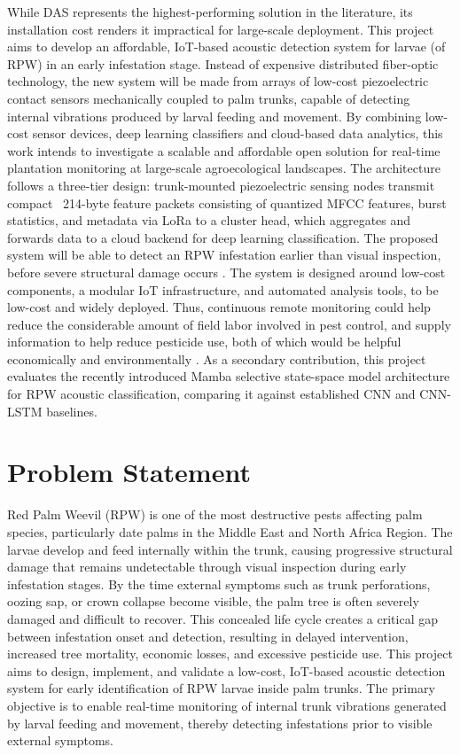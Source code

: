 \documentclass[12pt,a4paper,oneside]{memoir}
\begin{document}
While DAS represents the highest-performing solution in the literature, its installation cost renders it impractical for large-scale deployment. This project aims to develop an affordable, IoT-based acoustic detection system for larvae (of RPW) in an early infestation stage. Instead of expensive distributed fiber-optic technology, the new system will be made from arrays of low-cost piezoelectric contact sensors mechanically coupled to palm trunks, capable of detecting internal vibrations produced by larval feeding and movement. By combining low-cost sensor devices, deep learning classifiers and cloud-based data analytics, this work intends to investigate a scalable and affordable open solution for real-time plantation monitoring at large-scale agroecological landscapes. The architecture follows a three-tier design: trunk-mounted piezoelectric sensing nodes transmit compact ~214-byte feature packets consisting of quantized MFCC features, burst statistics, and metadata via LoRa to a cluster head, which aggregates and forwards data to a cloud backend for deep learning classification. The proposed system will be able to detect an RPW infestation earlier than visual inspection, before severe structural damage occurs \cite{ashry2020,ashry2022cnn,karar2022}. The system is designed around low-cost components, a modular IoT infrastructure, and automated analysis tools, to be low-cost and widely deployed. Thus, continuous remote monitoring could help reduce the considerable amount of field labor involved in pest control, and supply information to help reduce pesticide use, both of which would be helpful economically and environmentally \cite{saleem2022,karar2022}. As a secondary contribution, this project evaluates the recently introduced Mamba selective state-space model architecture for RPW acoustic classification, comparing it against established CNN and CNN-LSTM baselines.
 
\section{Problem Statement}
\label{sec:Statement}
 
Red Palm Weevil (RPW) is one of the most destructive pests affecting palm species, particularly date palms in the Middle East and North Africa Region. The larvae develop and feed internally within the trunk, causing progressive structural damage that remains undetectable through visual inspection during early infestation stages. By the time external symptoms such as trunk perforations, oozing sap, or crown collapse become visible, the palm tree is often severely damaged and difficult to recover. This concealed life cycle creates a critical gap between infestation onset and detection, resulting in delayed intervention, increased tree mortality, economic losses, and excessive pesticide use. This project aims to design, implement, and validate a low-cost, IoT-based acoustic detection system for early identification of RPW larvae inside palm trunks. The primary objective is to enable real-time monitoring of internal trunk vibrations generated by larval feeding and movement, thereby detecting infestations prior to visible external symptoms.
 
\end{document}
